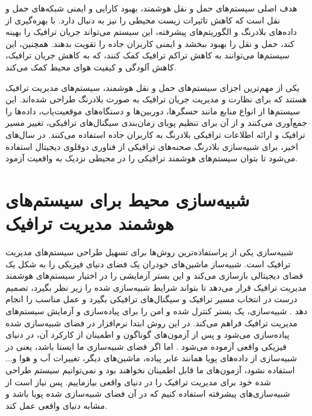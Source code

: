 هدف اصلی سیستم‌های حمل و نقل هوشمند، بهبود کارایی و ایمنی شبکه‌های حمل و نقل است که کاهش تاثیرات زیست محیطی را نیز به دنبال دارد. با بهره‌گیری از داده‌های بلادرنگ و الگوریتم‌های پیشرفته، این سیستم‌ می‌تواند جریان ترافیک را بهینه کند، حمل و نقل را بهبود ببخشد و ایمنی کاربران جاده را تقویت بدهند. همچنین، این سیستم‌ها می‌توانند به کاهش تراکم ترافیک کمک کنند، که به کاهش جریان ترافیک، کاهش آلودگی و کیفیت هوای محیط کمک می‌کند.

یکی از مهم‌ترین اجزای سیستم‌های حمل و نقل هوشمند، سیستم‌های مدیریت ترافیک هستند که برای نظارت و مدیریت جریان ترافیک به صورت بلادرنگ طراحی شده‌اند. این سیستم‌ها از انواع منابع مانند حسگر‌ها، دوربین‌ها و دستگاه‌های موقعیت‌یاب، داده‌‌ها را جمع‌آوری می‌کنند و از آن برای تنظیم پویای زمان‌بندی سیگنال‌های ترافیکی، تغییر مسیر ترافیک و ارائه اطلاعات ترافیکی بلادرنگ به کاربران جاده استفاده می‌کنند.
در سال‌های اخیر، برای شبیه‌سازی بلادرنگ صحنه‌های ترافیکی از فناوری دوقلوی دیجیتال استفاده می‌شود تا بتوان سیستم‌های هوشمند ترافیکی را در محیطی نزدیک به واقعیت آزمود.
\section{شبیه‌سازی محیط برای سیستم‌های هوشمند مدیریت ترافیک}
شبیه‌سازی یکی از پراستفاده‌ترین روش‌ها برای تسهیل طراحی سیستم‌‌های مدیریت ترافیک است. شبیه‌ساز ماشین‌های خودران یک فضای دنیای فیزیکی را به شکل یک فضای دیجیتالی بازسازی می‌کند و این بستر آزمایشی را در اختیار سیستم‌های هوشمند مدیریت ترافیک قرار می‌دهد تا بتواند شرایط شبیه‌سازی شده را زیر نظر بگیرد، تصمیم درست در انتخاب مسیر ترافیک و سیگنال‌های ترافیکی بگیرد و عمل مناسب را انجام دهد \cite{wang2022automatic}. شبیه‌سازی، یک بستر کنترل شده و امن را برای پیاده‌سازی و آزمایش سیستم‌‌های مدیریت ترافیک فراهم می‌کند. در این روش ابتدا نرم‌افزار در فضای شبیه‌سازی شده پیاده‌سازی می‌شود و پس از آزمون‌های گوناگون و اطمینان از کارکرد آن، در دنیای فیزیکی واقعی آزموده می‌شود \cite{wang2022automatic}. اما اگر فضای شبیه‌سازی ما ایستا باشد، یعنی در شبیه‌سازی از داده‌های پویا همانند عابر پیاده، ماشین‌های دیگر، تغییرات آب و هوا و... استفاده نشود، آزمون‌های ما قابل اطمینان نخواهند بود و نمی‌توانیم سیستم طراحی شده خود برای مدیریت ترافیک را در دنیای واقعی بیازماییم. پس نیاز است از شبیه‌سازی‌های پیشرفته‌ استفاده ‌کنیم که در آن فضای شبیه‌سازی شده پویا باشد و مشابه دنیای‌ واقعی عمل کند.

